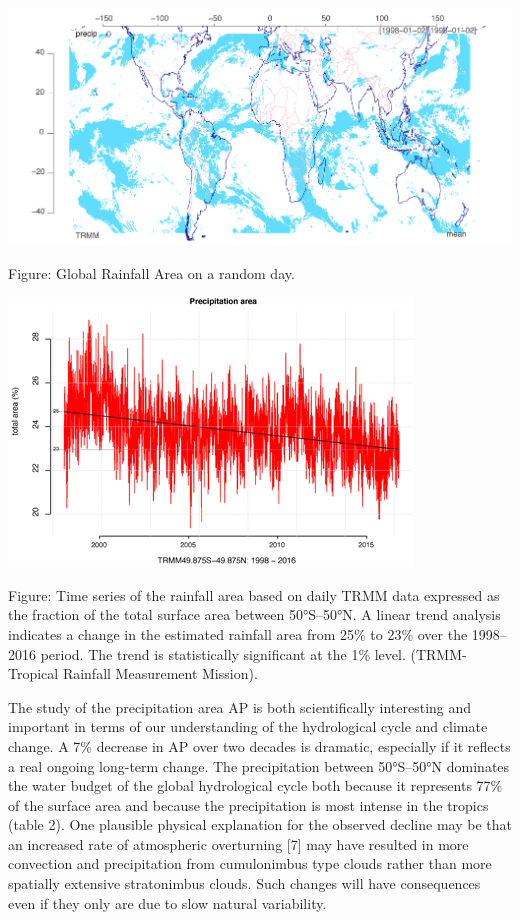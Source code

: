 \documentclass[
]{book}
\begin{document}
\includegraphics{fig/rainfall_area_random_day.jpg}

Figure: Global Rainfall Area on a random day.

\includegraphics{fig/rainfall_area_trend.jpg}

Figure: Time series of the rainfall area based on daily TRMM data expressed as the fraction of the total surface area between 50°S--50°N. A linear trend analysis indicates a change in the estimated rainfall area from 25\% to 23\% over the 1998--2016 period. The trend is statistically significant at the 1\% level.
(TRMM- Tropical Rainfall Measurement Mission).

The study of the precipitation area AP is both scientifically interesting and important in terms of our understanding of the hydrological cycle and climate change. A 7\% decrease in AP over two decades is dramatic, especially if it reflects a real ongoing long-term change. The precipitation between 50°S--50°N dominates the water budget of the global hydrological cycle both because it represents 77\% of the surface area and because the precipitation is most intense in the tropics (table 2). One plausible physical explanation for the observed decline may be that an increased rate of atmospheric overturning {[}7{]} may have resulted in more convection and precipitation from cumulonimbus type clouds rather than more spatially extensive stratonimbus clouds. Such changes will have consequences even if they only are due to slow natural variability.
\end{document}
